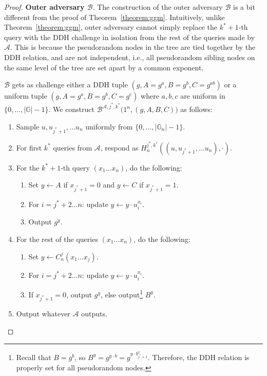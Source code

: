 \documentclass[12pt]{tufte-book}
\begin{document}
\begin{proof}
    \noindent \textbf{Outer adversary $\mathcal{B}$}. The construction of the outer adversary $\mathcal{B}$ is a bit different from the proof of Theorem~\ref{theorem:ggm}. Intuitively, unlike Theorem~\ref{theorem:ggm}, outer adversary cannot simply replace the $k^*+1$-th query with the DDH challenge in isolation from the rest of the queries made by $\mathcal{A}$. This is because the pseudorandom nodes in the tree are tied together by the DDH relation, and are not independent, i.e., all pseudorandom sibling nodes on the same level of the tree are set apart by a common exponent.

    $\mathcal{B}$ gets as challenge either a DDH tuple $(g, A=g^a, B=g^b, C=g^{ab})$ or a uniform tuple $(g, A=g^a, B=g^b, C=g^c)$ where $a, b, c$ are uniform in $\{0, \dots, |\mathbb{G}|-1\}$. We construct $\mathcal{B}^{\mathcal{A}, j^*, k^*}\big(1^n, (g, A, B, C)\big)$ as follows:
    \begin{enumerate}
        \item Sample $u, u_{j^*+1}, \ldots u_n$ uniformly from $\{0, \dots, |\mathbb{G}_n|-1\}$.
        \item For first $k^*$ queries from $\mathcal{A}$, respond as $H_n^{j^*, k^*}((u, u_{j^*+1}, \ldots u_n),\cdot)$.
        \item For the $k^*+1$-th query $(x_1\ldots x_n)$, do the following:
              \begin{enumerate}
                  \item Set $y \gets A$ if $x_{j^*+1} = 0$ and $y \gets C$ if $x_{j^*+1} = 1$.
                  \item For $i = j^*+2 \dots n$: update $y \gets y \cdot u_i^{x_i}$.
                  \item Output $g^y$.
              \end{enumerate}
        \item For the rest of the queries $(x_1\ldots x_n)$, do the following:
              \begin{enumerate}
                  \item Set $y \gets C^j_n(x_1\ldots x_j)$.
                  \item For $i = j^*+2 \dots n$: update $y \gets y \cdot u_i^{x_i}$.
                  \item If $x_{j^*+1} = 0$, output $g^y$, else output\footnote{Recall that $B=g^b$, so $B^y = g^{y\cdot b} = g^{y\cdot b^x_{j^*+1}}$. Therefore, the DDH relation is properly set for all pseudorandom nodes.} $B^y$.
              \end{enumerate}
        \item Output whatever $\mathcal{A}$ outputs.
    \end{enumerate}


\end{proof}
\end{document}
